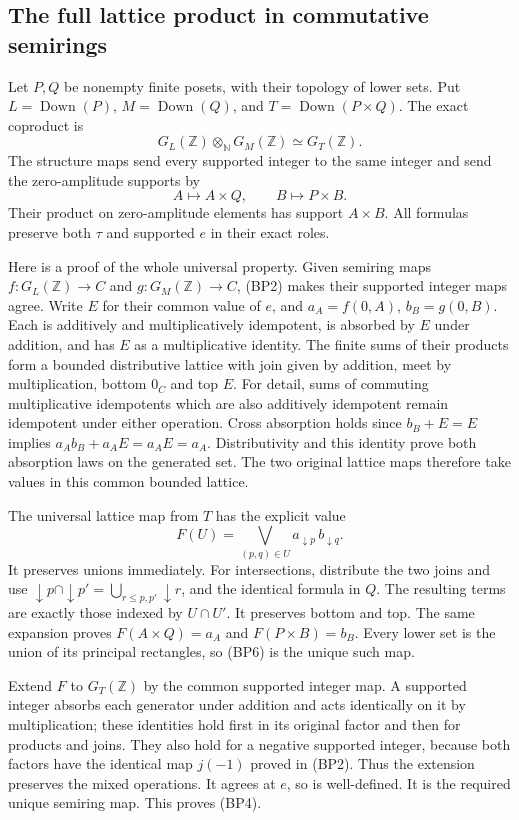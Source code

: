 \documentclass[11pt,a4paper]{article}
\theoremstyle{definition}\newtheorem{definition}[theorem]{Definition}
\begin{document}
\subsection{The full lattice product in commutative semirings}

Let $P,Q$ be nonempty finite posets, with their topology of lower
sets. Put $L=\operatorname{Down}(P)$, $M=\operatorname{Down}(Q)$,
and $T=\operatorname{Down}(P\times Q)$. The exact coproduct is
\[
 G_L(\mathbb Z)\otimes_{\mathbb N}G_M(\mathbb Z)
       \simeq G_T(\mathbb Z).
 \tag{BP4}
\]
The structure maps send every supported integer to the same integer
and send the zero-amplitude supports by
\[
 A\longmapsto A\times Q,\qquad B\longmapsto P\times B.
 \tag{BP5}
\]
Their product on zero-amplitude elements has support $A\times B$.
All formulas preserve both $\tau$ and supported $e$ in their exact
roles.

Here is a proof of the whole universal property. Given semiring maps
$f:G_L(\mathbb Z)\to C$ and $g:G_M(\mathbb Z)\to C$, (BP2)
makes their supported integer maps agree. Write $E$ for their common
value of $e$, and $a_A=f(0,A)$, $b_B=g(0,B)$. Each is additively
and multiplicatively idempotent, is absorbed by $E$ under addition,
and has $E$ as a multiplicative identity. The finite sums of their
products form a bounded distributive lattice with join given by
addition, meet by multiplication, bottom $0_C$ and top $E$.
For detail, sums of commuting multiplicative idempotents which are
also additively idempotent remain idempotent under either operation.
Cross absorption holds since $b_B+E=E$ implies
$a_Ab_B+a_AE=a_AE=a_A$. Distributivity and this identity prove both
absorption laws on the generated set. The two original lattice maps
therefore take values in this common bounded lattice.

The universal lattice map from $T$ has the explicit value
\[
 F(U)=\bigvee_{(p,q)\in U} a_{\downarrow p}\,b_{\downarrow q}.
 \tag{BP6}
\]
It preserves unions immediately. For intersections, distribute the
two joins and use
$\downarrow p\cap\downarrow p'
 =\bigcup_{r\le p,p'}\downarrow r$, and the identical formula
in $Q$. The resulting terms are exactly those indexed by $U\cap U'$.
It preserves bottom and top. The same expansion proves
$F(A\times Q)=a_A$ and $F(P\times B)=b_B$. Every lower set is the
union of its principal rectangles, so (BP6) is the unique such map.

Extend $F$ to $G_T(\mathbb Z)$ by the common supported integer map.
A supported integer absorbs each generator under addition and
acts identically on it by multiplication; these identities hold
first in its original factor and then for products and joins.
They also hold for a negative supported integer, because both factors
have the identical map $j(-1)$ proved in (BP2). Thus the extension
preserves the mixed operations. It agrees at $e$, so is well-defined.
It is the required unique semiring map. This proves (BP4).
\end{document}
